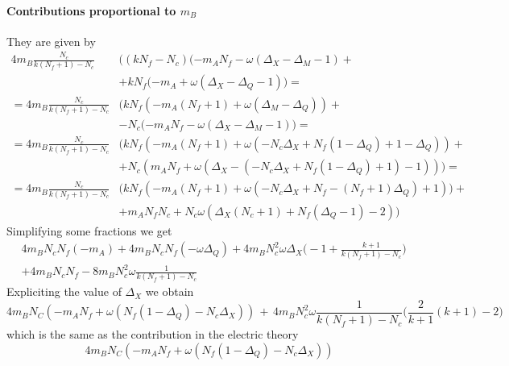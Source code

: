 \begin{appendices}
\paragraph{Contributions proportional to $m_B$}
They are given by
\begin{equation}
\begin{aligned}
4 m_B \frac{N_c}{k(N_f+1)-N_c} & \bigg( (k N_f - N_c ) ( -m_A N_f - \omega ( \Delta_X - \Delta_M -1) +\\
 & +  k N_f ( -m_A + \omega ( \Delta_X - \Delta_Q -1) \bigg) = \\
 =   4 m_B \frac{N_c}{k(N_f+1)-N_c} & \bigg ( k N_f ( - m_A (N_f+1)  +\omega( \Delta_M - \Delta_Q)) +\\
 & - N_c ( - m_A N_f - \omega( \Delta_X - \Delta_M-1) \bigg) = \\
 = 4 m_B \frac{N_c}{k(N_f+1)-N_c} & \bigg ( k N_f ( - m_A (N_f+1) + \omega ( - N_c \Delta_X + N_f( 1- \Delta_Q) + 1  - \Delta_Q) ) + \\
 & + N_c (  m_A N_f +  \omega( \Delta_X - (- N_c \Delta_X + N_f( 1- \Delta_Q) + 1)-1) ) \bigg) = \\
  =  4 m_B \frac{N_c}{k(N_f+1)-N_c} & \bigg ( k N_f ( - m_A (N_f+1) +\omega( - N_c \Delta_X + N_f - (N_f+1) \Delta_Q) + 1)) +\\
  & + m_A N_f N_c   + N_c \omega  (    \Delta_X (N_c+1) + N_f( \Delta_Q - 1) - 2) \bigg)
\end{aligned}
\end{equation}
Simplifying some fractions we get
\begin{equation}
\begin{aligned}
& 4 m_B N_c N_f (-m_A) + 4 m_B N_c N_f ( - \omega \Delta_Q)  + 4 m_B N_c^2 \omega \Delta_X \bigg(- 1 + \frac{k+1}{k (N_f+1)-N_c} \bigg) \\
& + 4 m_B N_c N_f   -8m_B N_c^2 \omega \frac{1}{k (N_f+1) - N_c} 
\end{aligned}
\end{equation}
Expliciting the value of $\Delta_X$ we obtain
\begin{equation}
	4 m_B N_C ( - m_A N_f + \omega ( N_f ( 1 - \Delta_Q) - N_c \Delta_X )) \, + \, 4 m_B N_c^2 \omega \frac{1}{k (N_f+1)-N_c} \bigg({\frac{2}{k+1}} (k+1) - 2 \bigg)
\end{equation}
which is the same as the contribution in the electric theory
\begin{equation}
4 m_B N_C ( - m_A N_f + \omega ( N_f ( 1 - \Delta_Q) - N_c \Delta_X ))
\end{equation}




\end{appendices}
